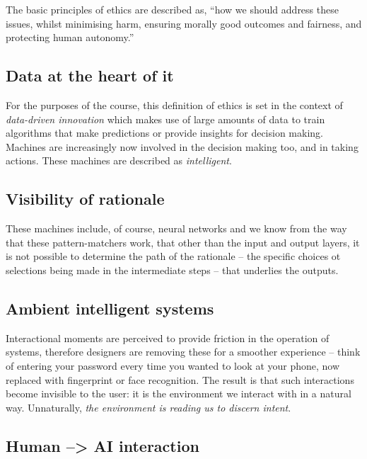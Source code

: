 \documentclass[
]{book}
\begin{document}
The basic principles of ethics are described as, ``how we should address these issues, whilst minimising harm, ensuring morally good outcomes and fairness, and protecting human autonomy.''

\hypertarget{data-at-the-heart-of-it}{%
\subsection{Data at the heart of it}\label{data-at-the-heart-of-it}}

For the purposes of the course, this definition of ethics is set in the context of \emph{data-driven innovation} which makes use of large amounts of data to train algorithms that make predictions or provide insights for decision making. Machines are increasingly now involved in the decision making too, and in taking actions. These machines are described as \emph{intelligent}.

\hypertarget{visibility-of-rationale}{%
\subsection{Visibility of rationale}\label{visibility-of-rationale}}

These machines include, of course, neural networks and we know from the way that these pattern-matchers work, that other than the input and output layers, it is not possible to determine the path of the rationale -- the specific choices ot selections being made in the intermediate steps -- that underlies the outputs.

\hypertarget{ambient-intelligent-systems}{%
\subsection{Ambient intelligent systems}\label{ambient-intelligent-systems}}

Interactional moments are perceived to provide friction in the operation of systems, therefore designers are removing these for a smoother experience -- think of entering your password every time you wanted to look at your phone, now replaced with fingerprint or face recognition. The result is that such interactions become invisible to the user: it is the environment we interact with in a natural way. Unnaturally, \emph{the environment is reading us to discern intent}.

\hypertarget{human-ai-interaction}{%
\subsection{Human --\textgreater{} AI interaction}\label{human-ai-interaction}}
\end{document}
